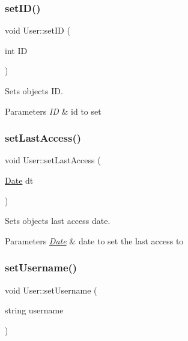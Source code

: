 \subsubsection{\texorpdfstring{set\+I\+D()}{setID()}}
{\footnotesize\ttfamily void User\+::set\+ID (\begin{DoxyParamCaption}\item[{int}]{ID }\end{DoxyParamCaption})}



Sets object\textquotesingle{}s ID. 


\begin{DoxyParams}{Parameters}
{\em ID} & id to set \\
\hline
\end{DoxyParams}
\mbox{\label{group___user_ga5578e73f0915b2ebf38eff4434fc340d}} 
\subsubsection{\texorpdfstring{set\+Last\+Access()}{setLastAccess()}}
{\footnotesize\ttfamily void User\+::set\+Last\+Access (\begin{DoxyParamCaption}\item[{\hyperlink{class_date}{Date}}]{dt }\end{DoxyParamCaption})}



Sets object\textquotesingle{}s last access date. 


\begin{DoxyParams}{Parameters}
{\em \hyperlink{class_date}{Date}} & date to set the last access to \\
\hline
\end{DoxyParams}
\mbox{\label{group___user_ga0fed77d10cd142ee4112d650ec564e6b}} 
\subsubsection{\texorpdfstring{set\+Username()}{setUsername()}}
{\footnotesize\ttfamily void User\+::set\+Username (\begin{DoxyParamCaption}\item[{string}]{username }\end{DoxyParamCaption})}




